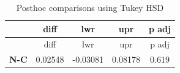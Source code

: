 \documentclass[]{article}
\begin{document}
\begin{longtable}[]{@{}ccccc@{}}
\caption{Posthoc comparisons using Tukey HSD}\tabularnewline
\toprule
\begin{minipage}[b]{0.13\columnwidth}\centering\strut
~\strut
\end{minipage} & \begin{minipage}[b]{0.14\columnwidth}\centering\strut
diff\strut
\end{minipage} & \begin{minipage}[b]{0.16\columnwidth}\centering\strut
lwr\strut
\end{minipage} & \begin{minipage}[b]{0.13\columnwidth}\centering\strut
upr\strut
\end{minipage} & \begin{minipage}[b]{0.13\columnwidth}\centering\strut
p adj\strut
\end{minipage}\tabularnewline
\midrule
\endfirsthead
\toprule
\begin{minipage}[b]{0.13\columnwidth}\centering\strut
~\strut
\end{minipage} & \begin{minipage}[b]{0.14\columnwidth}\centering\strut
diff\strut
\end{minipage} & \begin{minipage}[b]{0.16\columnwidth}\centering\strut
lwr\strut
\end{minipage} & \begin{minipage}[b]{0.13\columnwidth}\centering\strut
upr\strut
\end{minipage} & \begin{minipage}[b]{0.13\columnwidth}\centering\strut
p adj\strut
\end{minipage}\tabularnewline
\midrule
\endhead
\begin{minipage}[t]{0.13\columnwidth}\centering\strut
\textbf{N-C}\strut
\end{minipage} & \begin{minipage}[t]{0.14\columnwidth}\centering\strut
0.02548\strut
\end{minipage} & \begin{minipage}[t]{0.16\columnwidth}\centering\strut
-0.03081\strut
\end{minipage} & \begin{minipage}[t]{0.13\columnwidth}\centering\strut
0.08178\strut
\end{minipage} & \begin{minipage}[t]{0.13\columnwidth}\centering\strut
0.619\strut

\end{minipage}
\end{longtable}
\end{document}
